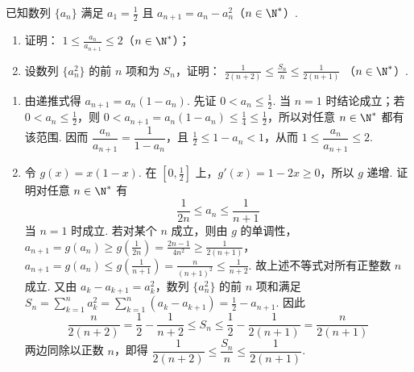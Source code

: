 \begin{problem}
已知数列 \(\{a_{n}\}\) 满足 \(a_1 = \frac{1}{2}\) 且 \(a_{n + 1} = a_n - a_n^2\)（\(n\in \N^*\)）.
\begin{enumerate}
\item 证明： \(1 \leqslant \frac{a_n}{a_{n+1}} \leqslant 2\)（\(n \in \N^*\)）；
\item 设数列 \(\{a_n^2\}\) 的前 \(n\) 项和为 \(S_n\)，证明： \(\frac{1}{2(n+2)} \leqslant \frac{S_n}{n} \leqslant \frac{1}{2(n+1)}\) （\(n \in \N^*\)）.
\end{enumerate}
\end{problem}

\begin{solution}
\begin{enumerate}
\item 由递推式得 \(a_{n+1}=a_n(1-a_n)\). 先证 \(0<a_n\leqslant\frac12\). 当 \(n=1\) 时结论成立；若 \(0<a_n\leqslant\frac12\)，则 \(0<a_{n+1}=a_n(1-a_n)\leqslant\frac14\leqslant\frac12\)，所以对任意 \(n\in\N^*\) 都有该范围. 因而
\(\dfrac{a_n}{a_{n+1}}=\dfrac{1}{1-a_n}\)，且 \(\frac12\leqslant1-a_n<1\)，从而 \(1\leqslant\dfrac{a_n}{a_{n+1}}\leqslant2\).

\item 令 \(g(x)=x(1-x)\). 在 \(\left[0,\frac12\right]\) 上，\(g'(x)=1-2x\geqslant0\)，所以 \(g\) 递增. 证明对任意 \(n\in\N^*\) 有
\[
\frac{1}{2n}\leqslant a_n\leqslant\frac{1}{n+1}
\]
当 \(n=1\) 时成立. 若对某个 \(n\) 成立，则由 \(g\) 的单调性，
\(a_{n+1}=g(a_n)\geqslant g\left(\frac{1}{2n}\right)=\frac{2n-1}{4n^2}\geqslant\frac{1}{2(n+1)}\)，\(a_{n+1}=g(a_n)\leqslant g\left(\frac{1}{n+1}\right)=\frac{n}{(n+1)^2}\leqslant\frac{1}{n+2}\).
故上述不等式对所有正整数 \(n\) 成立. 又由 \(a_k-a_{k+1}=a_k^2\)，数列 \(\{a_n^2\}\) 的前 \(n\) 项和满足
\(S_n=\sum_{k=1}^{n}a_k^2=\sum_{k=1}^{n}(a_k-a_{k+1})=\frac12-a_{n+1}\). 因此
\[
\frac{n}{2(n+2)}=\frac12-\frac{1}{n+2}\leqslant S_n\leqslant\frac12-\frac{1}{2(n+1)}=\frac{n}{2(n+1)}
\]
两边同除以正数 \(n\)，即得 \(\dfrac{1}{2(n+2)}\leqslant\dfrac{S_n}{n}\leqslant\dfrac{1}{2(n+1)}\).
\end{enumerate}
\end{solution}
